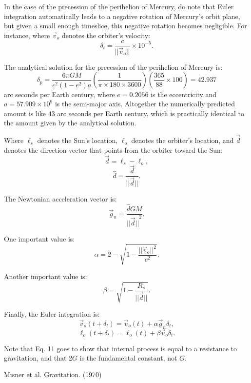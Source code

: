 \documentclass[12pt]{article}
\begin{document}
In the case of the precession of the perihelion of Mercury, do note that Euler integration automatically leads to a negative rotation of Mercury's orbit plane, but given a small enough timeslice, this negative rotation becomes negligible.
For instance, where $\vec{v}_{o}$ denotes the orbiter's velocity:
\begin{equation}
\delta_{t} = \frac{c}{\lvert\lvert \vec{v}_{o} \rvert \rvert} \times 10^{-5}.
\end{equation}

The analytical solution for the precession of the perihelion of Mercury is:
\begin{equation}
\delta_{p} = \frac{6 \pi G M}{c^2 (1 - e^2) a} \left( \frac{1}{ \pi \times 180 \times 3600} \right) \left( \frac{365}{88} \times 100 \right) = 42.937
\end{equation}
arc seconds per Earth century, where $e = 0.2056$ is the eccentricity and $a = 57.909 \times 10^9$ is the semi-major axis.
Altogether the numerically predicted amount is like $43$ arc seconds per Earth century, which is practically identical to the amount given by the analytical solution.

Where $\ell_s$ denotes the Sun's location, $\ell_o$ denotes the orbiter's location, and $\vec{d}$ denotes the direction vector that points from the orbiter toward the Sun:
\begin{equation}
\vec{d} = \ell_{s} - \ell_{o},	
\end{equation}
\begin{equation}
\hat{d} = \frac{\vec{d}}{\lvert\lvert \vec{d} \rvert\rvert}.
\end{equation}

The Newtonian acceleration vector is:
\begin{equation}
\vec{g}_n =  \frac{\hat{d} G M}{{\lvert\lvert \vec{d} \rvert\rvert}^2}.
\end{equation}

One important value is:
\begin{equation}
\alpha = 2 - \sqrt{1 - \frac{\lvert\lvert \vec{v}_{o}\rvert\rvert^2}{c^2}}.
\end{equation}

Another important value is:
\begin{equation}
\beta = \sqrt{1 - \frac{R_{s}}{\lvert \lvert \vec{d} \rvert \rvert}}.
\end{equation}

Finally, the Euler integration is:
\begin{equation}
\vec{v}_{o}(t + \delta_t) = \vec{v}_{o}(t) + \alpha \vec{g}_n \delta_{t},
\end{equation}
\begin{equation}
\ell_{o}(t + \delta_t) = \ell_{o}(t) + \beta \vec{v}_{o} \delta_{t}.
\end{equation}

Note that Eq. 11 goes to show that internal process is equal to a resistance to gravitation, and that $2G$ is the fundamental constant, not $G$.





\begin{thebibliography}{9}


 Misner et al. Gravitation. (1970)






\end{thebibliography}
\end{document}

